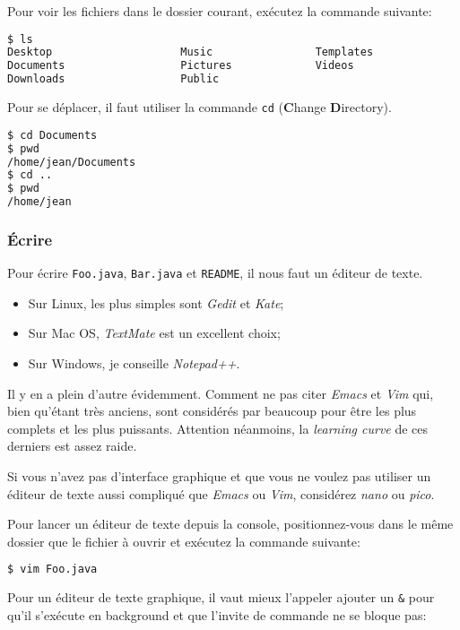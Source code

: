 Pour voir les fichiers dans le dossier courant, exécutez la commande suivante:
\begin{lstlisting}[language={sh}, morekeywords={ls}]
$ ls
Desktop                    Music                Templates
Documents                  Pictures             Videos
Downloads                  Public
\end{lstlisting}

Pour se déplacer, il faut utiliser la commande
\lstinline|cd| (\textbf{C}hange \textbf{D}irectory).
\begin{lstlisting}[language={sh}, morekeywords={xx}]
$ cd Documents
$ pwd
/home/jean/Documents
$ cd ..
$ pwd
/home/jean
\end{lstlisting}

\subsubsection{Écrire}
Pour écrire \lstinline|Foo.java|, \lstinline|Bar.java| et \lstinline|README|,
il nous faut un éditeur de texte.

\begin{itemize}
  \item Sur Linux, les plus simples sont {\em Gedit} et {\em Kate};
  \item Sur Mac OS, {\em TextMate} est un excellent choix;
  \item Sur Windows, je conseille {\em Notepad++}.
\end{itemize}

Il y en a plein d'autre évidemment. Comment ne pas citer {\em Emacs} et
{\em Vim} qui, bien qu'étant très anciens, sont considérés par beaucoup
pour être les plus complets et les plus puissants.
Attention néanmoins, la {\em learning curve} de ces derniers est assez raide.

Si vous n'avez pas d'interface graphique et que vous ne voulez pas utiliser
un éditeur de texte aussi compliqué que {\em Emacs} ou {\em Vim}, considérez
{\em nano} ou {\em pico}.

Pour lancer un éditeur de texte depuis la console,
positionnez-vous dans le même dossier que le fichier à ouvrir
et exécutez la commande suivante:
\begin{lstlisting}[language={sh}, morekeywords={vim}]
$ vim Foo.java
\end{lstlisting}
Pour un éditeur de texte graphique,
il vaut mieux l'appeler ajouter un \lstinline|&| pour qu'il s'exécute en
background et que l'invite de commande ne se bloque pas:

